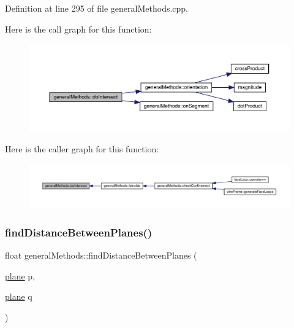 Definition at line 295 of file general\+Methods.\+cpp.

Here is the call graph for this function\+:
\nopagebreak
\begin{figure}[H]
\begin{center}
\leavevmode
\includegraphics[width=350pt]{namespacegeneral_methods_a56efd049c58aae30a7b0caf39beab615_cgraph}
\end{center}
\end{figure}
Here is the caller graph for this function\+:
\nopagebreak
\begin{figure}[H]
\begin{center}
\leavevmode
\includegraphics[width=350pt]{namespacegeneral_methods_a56efd049c58aae30a7b0caf39beab615_icgraph}
\end{center}
\end{figure}
\mbox{\label{namespacegeneral_methods_a3bc88a001e751ad419e87bf3795ca02b}} 
\subsubsection{\texorpdfstring{find\+Distance\+Between\+Planes()}{findDistanceBetweenPlanes()}}
{\footnotesize\ttfamily float general\+Methods\+::find\+Distance\+Between\+Planes (\begin{DoxyParamCaption}\item[{\mbox{\hyperlink{structplane}{plane}}}]{p,  }\item[{\mbox{\hyperlink{structplane}{plane}}}]{q }\end{DoxyParamCaption})}

